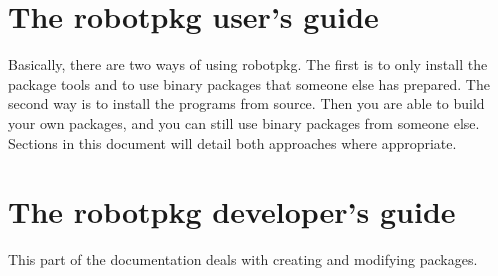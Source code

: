 \documentclass[a4paper,11pt]{book}
\begin{document}
\chapter{The robotpkg user's guide}
\label{chapter:user}

Basically, there are two ways of using robotpkg.  The  first is to only install
the  package tools and to  use binary packages that  someone else has prepared.
The second way is  to install the  programs from source. Then  you are  able to
build your own packages,  and you can  still use  binary packages from  someone
else. Sections in this document will detail both approaches where appropriate.







\chapter{The robotpkg developer's guide}
\label{chapter:developer}

This part of the documentation deals with creating and modifying packages.





\end{document}
